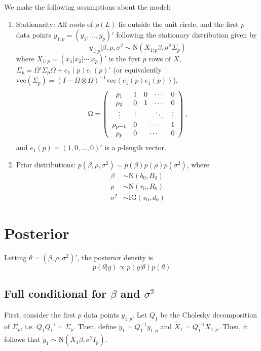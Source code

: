 \documentclass{article}
\begin{document}
We make the following assumptions about the model:
\begin{enumerate}
\item Stationarity: All roots of $\rho(L)$ lie outside the unit circle, and the first $p$ data points $y_{1:p} = (y_1,\ldots,y_p)'$ following the stationary distribution given by \[y_{1:p}|\beta,\rho,\sigma^2 \sim \mbox{N}(X_{1:p}\beta,\sigma^2\Sigma_p)\] where $X_{1:p} = (x_1|x_2|\cdots|x_p)'$ is the first $p$ rows of $X$, $\Sigma_p = \Omega'\Sigma_p\Omega + e_1(p)e_1(p)'$ (or equivalently $\mbox{vec}(\Sigma_p) = (I - \Omega \otimes \Omega)^{-1}\mbox{vec}(e_1(p)e_1(p))$), \[\Omega = \left(\begin{array}{ccccc} \rho_1 & 1 & 0 & \cdots & 0 \\
    \rho_2 & 0 & 1 & \cdots & 0 \\
    \vdots & \vdots & & \ddots & \vdots \\
    \rho_{p-1} & 0 & \multicolumn{2}{c}{\cdots} & 1 \\
    \rho_p & 0 & \multicolumn{2}{c}{\cdots} & 0 \end{array}\right),\] and $e_1(p) = (1,0,\ldots,0)'$ is a $p$-length vector.
\item Prior distributions: $p(\beta,\rho,\sigma^2) = p(\beta)p(\rho)p(\sigma^2)$, where
\begin{align*}
\beta &\sim \mbox{N}(b_0,B_0) \\
\rho &\sim \mbox{N}(r_0,R_0) \\
\sigma^2 &\sim \mbox{IG}(v_0,d_0)
\end{align*}
\end{enumerate}

\section{Posterior} \label{sec:fullcond}

Letting $\theta = (\beta,\rho,\sigma^2)'$, the posterior density is \[p(\theta|y) \propto p(y|\theta)p(\theta)\]

\subsection{Full conditional for $\beta$ and $\sigma^2$} \label{sec:fullcondbeta}

First, consider the first $p$ data points $y_{1:p}$. Let $Q_1$ be the Cholesky decomposition of $\Sigma_p$, i.e. $Q_1Q_1' = \Sigma_p$. Then, define $\tilde{y}_1 = Q_1^{-1}y_{1:p}$ and $\tilde{X}_1 = Q_1^{-1}X_{1:p}$. Then, it follows that $\tilde{y}_1 \sim \mbox{N}(\tilde{X}_1\beta,\sigma^2I_p)$.
\end{document}
